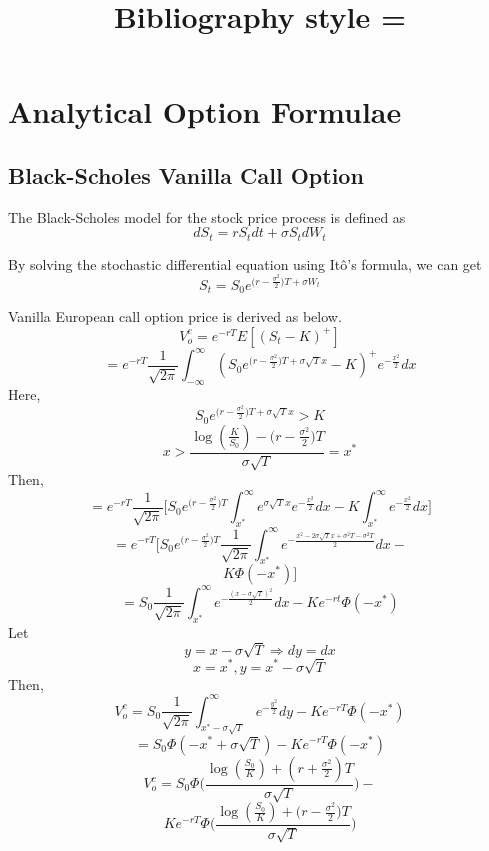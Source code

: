 \documentclass[fleqn,12pt]{SelfArx}
\title{Bibliography style = \mystyle}
\date{}
\begin{document}
\maketitle
\thispagestyle{empty} %


\section{Analytical Option Formulae}
\subsection{Black-Scholes Vanilla Call Option}

The Black-Scholes model for the stock price process is defined as
$$
dS_t = rS_tdt + \sigma S_tdW_t
$$

By solving the stochastic differential equation using It\^{o}'s formula, we can get
$$
S_t = S_0e^{\big(r-\frac{\sigma^2}{2}\big)T+\sigma W_t}
$$

Vanilla European call option price is derived as below.
$$
V_o^{c} = e^{-rT}{E}[(S_t-K)^{+}]
$$
$$
= e^{-rT}\frac{1}{\sqrt{2\pi}}\int_{-\infty}^{\infty}(S_0e^{\big(r-\frac{\sigma^{2}}{2}\big)T +\sigma\sqrt{T}x}-K)^{+}e^{-\frac{x^{2}}{2}}dx
$$
Here, 
$$S_0e^{\big(r-\frac{\sigma^{2}}{2}\big)T +\sigma\sqrt{T}x} > K$$
$$ 
x > \frac{\log({\frac{K}{S_0}})-\big(r-\frac{\sigma^{2}}{2}\big)T}{\sigma\sqrt{T}} = x^{*}
$$
Then,
$$
= e^{-rT}\frac{1}{\sqrt{2\pi}}\Bigg[S_0e^{\big(r-\frac{\sigma^{2}}{2}\big)T}\int_{x^{*}}^{\infty}e^{\sigma\sqrt{T}x}e^{-\frac{x^{2}}{2}}dx - K\int_{x^{*}}^{\infty}e^{-\frac{x^{2}}{2}}dx\Bigg]
$$$$
= e^{-rT}\Bigg[S_0e^{\big(r-\frac{\sigma^{2}}{2}\big)T}\frac{1}{\sqrt{2\pi}}\int_{x^{*}}^{\infty}e^{-\frac{x^{2}-2\sigma\sqrt{T}x+\sigma^{2}T-\sigma^{2}T}{2}}dx -
$$$$
K\Phi(-x^{*})\Bigg]
$$$$
= S_0\frac{1}{\sqrt{2\pi}}\int_{x^{*}}^{\infty}e^{-\frac{(x-\sigma\sqrt{T})^{2}}{2}}dx - Ke^{-rt}\Phi(-x^{*})
$$
Let 
$$y = x-\sigma\sqrt{T} \Rightarrow dy=dx$$
$$x = x^{*}, y = x^{*}-\sigma\sqrt{T}$$
Then,
$$
V_o^{c} = S_0\frac{1}{\sqrt{2\pi}}\int_{x^{*}-\sigma\sqrt{T}}^{\infty}e^{-\frac{y^{2}}{2}}dy - Ke^{-rT}\Phi(-x^{*})
$$
$$
= S_0\Phi(-x^{*}+\sigma\sqrt{T}) - Ke^{-rT}\Phi({-x^{*}})
$$$$
V_o^{c} = S_0\Phi\Bigg(\frac{\log({\frac{S_0}{K}})+(r+\frac{\sigma^{2}}{2})T}{\sigma\sqrt{T}}\Bigg) -
$$$$
Ke^{-rT}\Phi\Bigg(\frac{\log({\frac{S_0}{K}})+\big(r-\frac{\sigma^{2}}{2}\big)T}{\sigma\sqrt{T}}\Bigg)
$$
\end{document}
